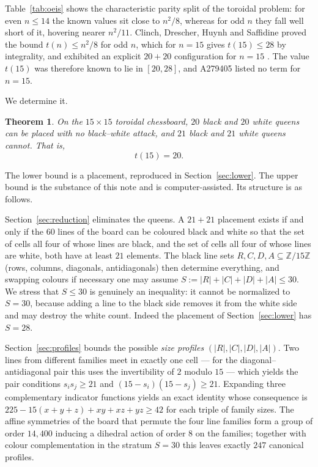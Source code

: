 \documentclass[11pt]{amsart}
\newtheorem{theorem}{Theorem}
\theoremstyle{remark}
\newcommand{\Z}{\mathbb{Z}}
\newcommand{\Zn}{\Z/15\Z}
\begin{document}
Table~\ref{tab:oeis} shows the characteristic parity split of the toroidal problem: for even $n\le 14$ the known values sit close to $n^2/8$, whereas for odd $n$ they fall well short of it, hovering nearer $n^2/11$. Clinch, Drescher, Huynh and Saffidine \cite[Theorem~1.4]{CDHS24} proved the bound $t(n)\le n^2/8$ for odd $n$, which for $n=15$ gives $t(15)\le 28$ by integrality, and exhibited an explicit $20+20$ configuration for $n=15$ \cite[Appendix~A]{CDHS24}. The value $t(15)$ was therefore known to lie in $[20,28]$, and A279405 listed no term for $n=15$.

We determine it.

\begin{theorem}\label{thm:main}
On the $15\times 15$ toroidal chessboard, $20$ black and $20$ white queens can be placed with no black--white attack, and $21$ black and $21$ white queens cannot. That is,
\[
t(15)=20 .
\]
\end{theorem}

The lower bound is a placement, reproduced in Section~\ref{sec:lower}. The upper bound is the substance of this note and is computer-assisted. Its structure is as follows.

Section~\ref{sec:reduction} eliminates the queens. A $21+21$ placement exists if and only if the $60$ lines of the board can be coloured black and white so that the set of cells all four of whose lines are black, and the set of cells all four of whose lines are white, both have at least $21$ elements. The black line sets $R,C,D,A\subseteq\Zn$ (rows, columns, diagonals, antidiagonals) then determine everything, and swapping colours if necessary one may assume $S:=|R|+|C|+|D|+|A|\le 30$. We stress that $S\le 30$ is genuinely an inequality: it cannot be normalized to $S=30$, because adding a line to the black side removes it from the white side and may destroy the white count. Indeed the placement of Section~\ref{sec:lower} has $S=28$.

Section~\ref{sec:profiles} bounds the possible \emph{size profiles} $(|R|,|C|,|D|,|A|)$. Two lines from different families meet in exactly one cell --- for the diagonal--antidiagonal pair this uses the invertibility of $2$ modulo $15$ --- which yields the pair conditions $s_is_j\ge 21$ and $(15-s_i)(15-s_j)\ge 21$. Expanding three complementary indicator functions yields an exact identity whose consequence is $225-15(x+y+z)+xy+xz+yz\ge 42$ for each triple of family sizes. The affine symmetries of the board that permute the four line families form a group of order $14{,}400$ inducing a dihedral action of order $8$ on the families; together with colour complementation in the stratum $S=30$ this leaves exactly $247$ canonical profiles.
\end{document}
